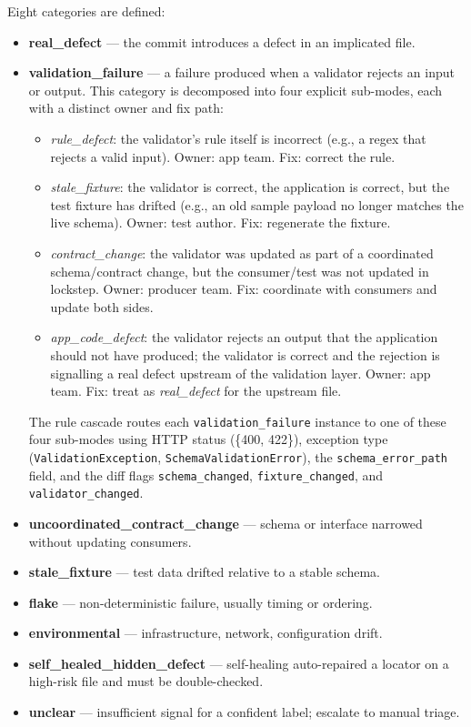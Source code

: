 \documentclass[conference]{IEEEtran}
\begin{document}
Eight categories are defined:
\begin{itemize}
    \item \textbf{real\_defect} --- the commit introduces a defect in an implicated file.
    \item \textbf{validation\_failure} --- a failure produced when a validator rejects an input or output. This category is decomposed into four explicit sub-modes, each with a distinct owner and fix path:
    \begin{itemize}
        \item \textit{rule\_defect}: the validator's rule itself is incorrect (e.g., a regex that rejects a valid input). Owner: app team. Fix: correct the rule.
        \item \textit{stale\_fixture}: the validator is correct, the application is correct, but the test fixture has drifted (e.g., an old sample payload no longer matches the live schema). Owner: test author. Fix: regenerate the fixture.
        \item \textit{contract\_change}: the validator was updated as part of a coordinated schema/contract change, but the consumer/test was not updated in lockstep. Owner: producer team. Fix: coordinate with consumers and update both sides.
        \item \textit{app\_code\_defect}: the validator rejects an output that the application should not have produced; the validator is correct and the rejection is signalling a real defect upstream of the validation layer. Owner: app team. Fix: treat as \textit{real\_defect} for the upstream file.
    \end{itemize}
    The rule cascade routes each \texttt{validation\_failure} instance to one of these four sub-modes using HTTP status (\{400, 422\}), exception type (\texttt{ValidationException}, \texttt{SchemaValidationError}), the \texttt{schema\_error\_path} field, and the diff flags \texttt{schema\_changed}, \texttt{fixture\_changed}, and \texttt{validator\_changed}.
    \item \textbf{uncoordinated\_contract\_change} --- schema or interface narrowed without updating consumers.
    \item \textbf{stale\_fixture} --- test data drifted relative to a stable schema.
    \item \textbf{flake} --- non-deterministic failure, usually timing or ordering.
    \item \textbf{environmental} --- infrastructure, network, configuration drift.
    \item \textbf{self\_healed\_hidden\_defect} --- self-healing auto-repaired a locator on a high-risk file and must be double-checked.
    \item \textbf{unclear} --- insufficient signal for a confident label; escalate to manual triage.
\end{itemize}
\end{document}
